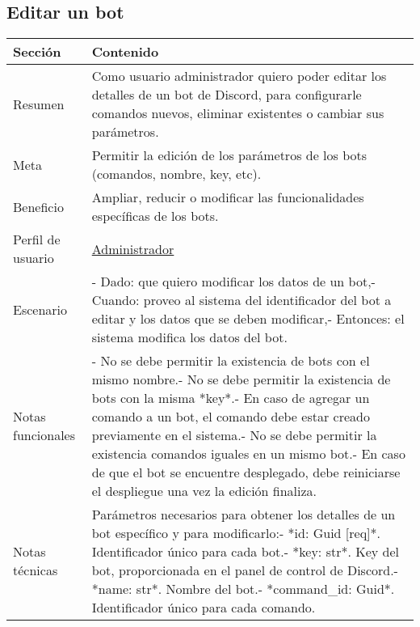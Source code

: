 \subsection{Editar un bot}

\begin{table}[H]
    \centering
    \begin{adjustbox}{max width=\textwidth}
    \begin{tabularx}{\textwidth}{|l|L|}
    \hline
        Sección & Contenido \\ \hline
        Resumen & Como usuario administrador quiero poder editar los detalles de un bot de Discord, para configurarle comandos nuevos, eliminar existentes o cambiar sus parámetros. \\ \hline
        Meta & Permitir la edición de los parámetros de los bots (comandos, nombre, key, etc). \\ \hline
        Beneficio & Ampliar, reducir o modificar las funcionalidades específicas de los bots. \\ \hline
        Perfil de usuario & \hyperref[sec:personaAdmin]{Administrador} \\ \hline
        Escenario & - Dado: que quiero modificar los datos de un bot,\linebreak - Cuando: proveo al sistema del identificador del bot a editar y los datos que se deben modificar,\linebreak - Entonces: el sistema modifica los datos del bot. \\ \hline
        Notas funcionales & - No se debe permitir la existencia de bots con el mismo nombre.\linebreak - No se debe permitir la existencia de bots con la misma *key*.\linebreak - En caso de agregar un comando a un bot, el comando debe estar creado previamente en el sistema.\linebreak - No se debe permitir la existencia comandos iguales en un mismo bot.\linebreak - En caso de que el bot se encuentre desplegado, debe reiniciarse el despliegue una vez la edición finaliza. \\ \hline
        Notas técnicas & Parámetros necesarios para obtener los detalles de un bot específico y para modificarlo:\linebreak - *id: Guid [req]*. Identificador único para cada bot.\linebreak - *key: str*. Key del bot, proporcionada en el panel de control de Discord.\linebreak - *name: str*. Nombre del bot.\linebreak - *command\_id: Guid*. Identificador único para cada comando. \\ \hline

\end{tabularx}
\end{adjustbox}
\end{table}
